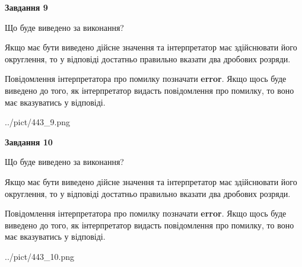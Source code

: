 \documentclass[12pt, ukrainian]{article}
\begin{document}
{\begin {Large}
{\begin {center}\textbf{Завдання 9}\end {center}}\par
Що буде виведено за виконання? \par

Якщо має бути виведено дійсне значення та інтерпретатор має здійснювати його округлення, 
то у відповіді достатньо правильно вказати два дробових розряди.

Повідомлення інтерпретатора про помилку позначати \textbf{error}.
Якщо щось буде виведено до того, як інтерпретатор видасть повідомлення про помилку, 
то воно має вказуватись у відповіді. \par

\begin{center}
	{../pict/443_9.png}
\end{center}
\newpage

{\begin {center}\textbf{Завдання 10}\end {center}}\par
Що буде виведено за виконання? \par

Якщо має бути виведено дійсне значення та інтерпретатор має здійснювати його округлення, 
то у відповіді достатньо правильно вказати два дробових розряди.

Повідомлення інтерпретатора про помилку позначати \textbf{error}.
Якщо щось буде виведено до того, як інтерпретатор видасть повідомлення про помилку, 
то воно має вказуватись у відповіді. \par

\begin{center}
	{../pict/443_10.png}
\end{center}
\newpage

\end {Large}}
\end{document}
